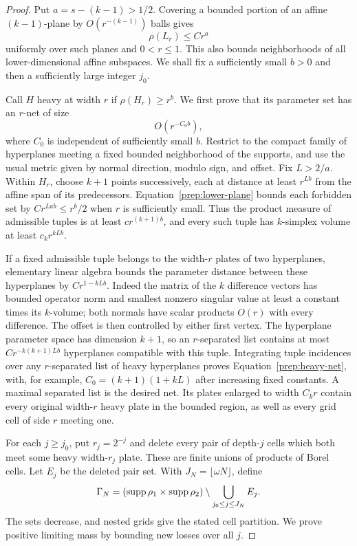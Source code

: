 \begin{proof}
Put $a=s-(k-1)>1/2$. Covering a bounded portion of an affine
$(k-1)$-plane by $O(r^{-(k-1)})$ balls gives
\begin{equation}\label{prep:lower-plane}
 \rho(L_r)\le C r^a
\end{equation}
uniformly over such planes and $0<r\le1$. This also bounds
neighborhoods of all lower-dimensional affine subspaces.
We shall fix a sufficiently small $b>0$ and then a sufficiently large
integer $j_0$.

Call $H$ heavy at width $r$ if $\rho(H_r)\ge r^b$.
We first prove that its parameter set has an $r$-net of size
\begin{equation}\label{prep:heavy-net}
 O(r^{-C_0b}),
\end{equation}
where $C_0$ is independent of sufficiently small $b$.
Restrict to the compact family of hyperplanes meeting a fixed bounded
neighborhood of the supports, and use the usual metric given by
normal direction, modulo sign, and offset. Fix $L>2/a$.
Within $H_r$, choose $k+1$ points successively, each at distance at
least $r^{Lb}$ from the affine span of its predecessors.
Equation~\eqref{prep:lower-plane} bounds each forbidden set by
$Cr^{Lab}\le r^b/2$ when $r$ is sufficiently small. Thus the
product measure of admissible tuples is at least $c r^{(k+1)b}$,
and every such tuple has $k$-simplex volume at least $c_k r^{kLb}$.

If a fixed admissible tuple belongs to the width-$r$ plates of two
hyperplanes, elementary linear algebra bounds the parameter distance
between these hyperplanes by $Cr^{1-kLb}$. Indeed the matrix of
the $k$ difference vectors has bounded operator norm and smallest
nonzero singular value at least a constant times its $k$-volume;
both normals have scalar products $O(r)$ with every difference.
The offset is then controlled by either first vertex. The hyperplane
parameter space has dimension $k+1$, so an $r$-separated list
contains at most $Cr^{-k(k+1)Lb}$ hyperplanes compatible with this
tuple. Integrating tuple incidences over any $r$-separated list of
heavy hyperplanes proves Equation~\eqref{prep:heavy-net}, with,
for example, $C_0=(k+1)(1+kL)$ after increasing fixed constants.
A maximal separated list is the desired net. Its plates enlarged to
width $C_kr$ contain every original width-$r$ heavy plate in the
bounded region, as well as every grid cell of side $r$ meeting one.

For each $j\ge j_0$, put $r_j=2^{-j}$ and delete every pair of
depth-$j$ cells which both meet some heavy width-$r_j$ plate.
These are finite unions of products of Borel cells. Let $E_j$ be
the deleted pair set. With $J_N=\lfloor\omega N\rfloor$, define
\begin{equation}\label{prep:gamma-definition}
 \Gamma_N=(\operatorname{supp}\rho_1\times\operatorname{supp}\rho_2)
              \setminus\bigcup_{j_0\le j\le J_N}E_j.
\end{equation}
The sets decrease, and nested grids give the stated cell partition.
We prove positive limiting mass by bounding new losses over all $j$.


\end{proof}
